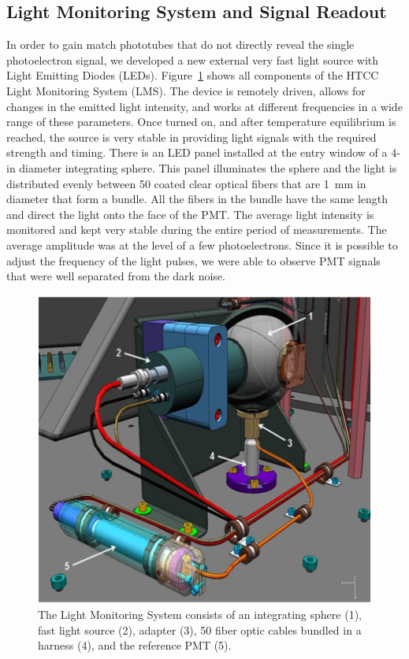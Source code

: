 \subsection{Light Monitoring System and Signal Readout}

In order to gain match phototubes that do not directly reveal the single photoelectron signal, we developed a new
external very fast light source with Light Emitting Diodes (LEDs). Figure~\ref{fig:LMS_Picture_3} shows all
components of the HTCC Light Monitoring System (LMS). The device is remotely driven, allows for changes in the
emitted light intensity, and works at different frequencies in a wide range of these parameters. Once turned on,
and after temperature equilibrium is reached, the source is very stable in providing light signals with the required
strength and timing. There is an LED panel installed at the entry window of a 4-in diameter integrating sphere. This
panel illuminates the sphere and the light is distributed evenly between 50 coated clear optical fibers that are 1~mm
in diameter that form a bundle. All the fibers in the bundle have the same length and direct the light onto the
face of the PMT. The average light intensity is monitored and kept very stable during the entire period of
measurements. The average amplitude was at the level of a few photoelectrons. Since it is possible to adjust the
frequency of the light pulses, we were able to observe PMT signals that were well separated from the dark noise.
 
\begin{figure}[!ht]
    \centering
    \includegraphics[width=1.0\linewidth,trim={0.0cm 0.0cm 0.0cm 0.0cm},clip]{images/LMS_Picture_3.jpg}
    \caption{The Light Monitoring System consists of an integrating sphere (1), fast light source (2), adapter (3),
      50 fiber optic cables bundled in a harness (4), and the reference PMT (5).}
    \label{fig:LMS_Picture_3}
\end{figure} 
 

